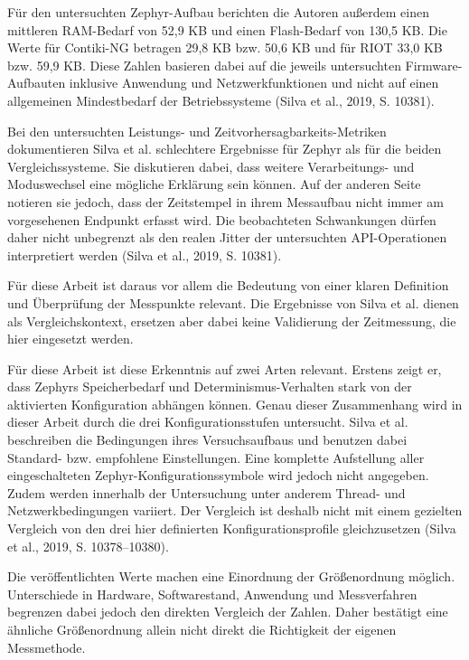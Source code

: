 F{\"u}r den untersuchten Zephyr-Aufbau berichten die Autoren au{\ss}erdem einen mittleren RAM-Bedarf von 52,9 KB und einen Flash-Bedarf von 130,5 KB. Die Werte f{\"u}r Contiki-NG betragen 29,8 KB bzw. 50,6 KB und f{\"u}r RIOT 33,0 KB bzw. 59,9 KB. Diese Zahlen basieren dabei auf die jeweils untersuchten Firmware-Aufbauten inklusive Anwendung und Netzwerkfunktionen und nicht auf einen allgemeinen Mindestbedarf der Betriebssysteme (Silva et al., 2019, S. 10381).

Bei den untersuchten Leistungs- und Zeitvorhersagbarkeits-Metriken dokumentieren Silva et al. schlechtere Ergebnisse f{\"u}r Zephyr als f{\"u}r die beiden Vergleichssysteme. Sie diskutieren dabei, dass weitere Verarbeitungs- und Moduswechsel eine m{\"o}gliche Erkl{\"a}rung sein k{\"o}nnen. Auf der anderen Seite notieren sie jedoch, dass der Zeitstempel in ihrem Messaufbau nicht immer am vorgesehenen Endpunkt erfasst wird. Die beobachteten Schwankungen d{\"u}rfen daher nicht unbegrenzt als den realen Jitter der untersuchten API-Operationen interpretiert werden (Silva et al., 2019, S. 10381).

F{\"u}r diese Arbeit ist daraus vor allem die Bedeutung von einer klaren Definition und {\"U}berpr{\"u}fung der Messpunkte relevant. Die Ergebnisse von Silva et al. dienen als Vergleichskontext, ersetzen aber dabei keine Validierung der Zeitmessung, die hier eingesetzt werden.

F{\"u}r diese Arbeit ist diese Erkenntnis auf zwei Arten relevant. Erstens zeigt er, dass Zephyrs Speicherbedarf und Determinismus-Verhalten stark von der aktivierten Konfiguration abh{\"a}ngen k{\"o}nnen. Genau dieser Zusammenhang wird in dieser Arbeit durch die drei Konfigurationsstufen untersucht. Silva et al. beschreiben die Bedingungen ihres Versuchsaufbaus und benutzen dabei Standard- bzw. empfohlene Einstellungen. Eine komplette Aufstellung aller eingeschalteten Zephyr-Konfigurationssymbole wird jedoch nicht angegeben. Zudem werden innerhalb der Untersuchung unter anderem Thread- und Netzwerkbedingungen variiert. Der Vergleich ist deshalb nicht mit einem gezielten Vergleich von den drei hier definierten Konfigurationsprofile gleichzusetzen (Silva et al., 2019, S. 10378--10380).

Die ver{\"o}ffentlichten Werte machen eine Einordnung der Gr{\"o}{\ss}enordnung m{\"o}glich. Unterschiede in Hardware, Softwarestand, Anwendung und Messverfahren begrenzen dabei jedoch den direkten Vergleich der Zahlen. Daher best{\"a}tigt eine {\"a}hnliche Gr{\"o}{\ss}enordnung allein nicht direkt die Richtigkeit der eigenen Messmethode.

